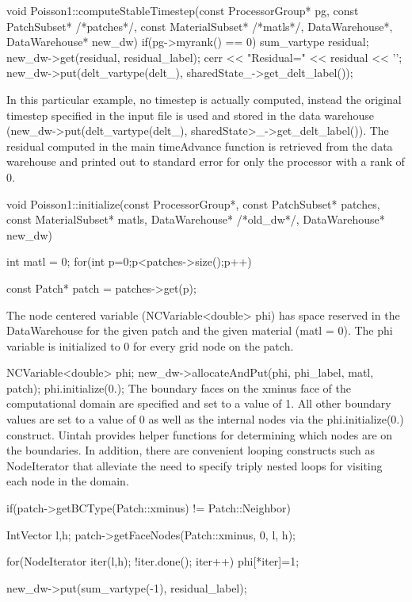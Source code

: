 \documentclass[12pt]{report}
\begin{document}
void Poisson1::computeStableTimestep(const ProcessorGroup* pg,
                                     const PatchSubset* /*patches*/,
                                     const MaterialSubset* /*matls*/,
                                     DataWarehouse*,
                                     DataWarehouse* new_dw)
{
  if(pg->myrank() == 0){
    sum_vartype residual;
    new_dw->get(residual, residual_label);
    cerr << "Residual=" << residual << '\n';
  }
  new_dw->put(delt_vartype(delt_), sharedState_->get_delt_label());
}

In this particular example,  no timestep is actually computed, instead the original timestep specified in the input file is used and stored in the data warehouse (new_dw->put(delt_vartype(delt_), sharedState>_->get_delt_label()).  The residual computed in the main timeAdvance function is retrieved from the data warehouse and printed out to standard error for only the processor with a rank of 0.  

void Poisson1::initialize(const ProcessorGroup*,
                          const PatchSubset* patches,
                          const MaterialSubset* matls,
                          DataWarehouse* /*old_dw*/, DataWarehouse* new_dw)
{
  int matl = 0;
  for(int p=0;p<patches->size();p++){
    const Patch* patch = patches->get(p);


The node centered variable (NCVariable<double> phi) has space reserved in the DataWarehouse for the given patch and the given material (matl = 0).   The phi variable is initialized to 0 for every grid node on the patch.

    NCVariable<double> phi;
    new_dw->allocateAndPut(phi, phi_label, matl, patch);
    phi.initialize(0.);
The boundary faces on the xminus face of the computational domain are specified and set to a value of 1.  All other boundary values are set to a value of 0 as well as the internal nodes via the phi.initialize(0.) construct.  Uintah provides helper functions for determining which nodes are on the boundaries.  In addition, there are convenient looping constructs such as NodeIterator that alleviate the need to specify triply nested loops for visiting each node in the domain.

    if(patch->getBCType(Patch::xminus) != Patch::Neighbor){
       IntVector l,h;
       patch->getFaceNodes(Patch::xminus, 0, l, h);

      for(NodeIterator iter(l,h); !iter.done(); iter++){
         phi[*iter]=1;
      }
    }

    new_dw->put(sum_vartype(-1), residual_label);
  }
}
\end{document}
